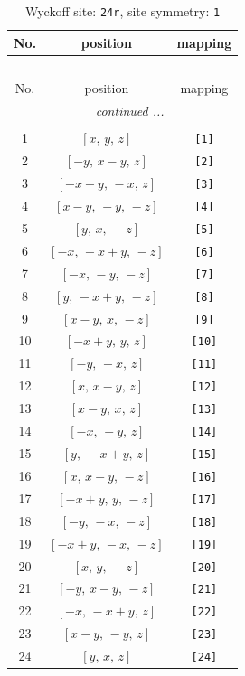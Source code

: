 \documentclass[fleqn,8pt]{jsarticle}
\begin{document}
\begin{longtable}{ccc}
\caption{Wyckoff site: {\tt 24r}, site symmetry: {\tt 1}}
 \\
 \hline \hline
No. & position & mapping \\ \hline \endfirsthead

\multicolumn{2}{l}{\tablename\ \thetable{}} \\
 \hline \hline
No. & position & mapping \\ \hline \endhead

 \hline \hline
\multicolumn{2}{r}{\footnotesize\it continued ...} \\ \endfoot

 \hline \hline
\multicolumn{2}{r}{} \\ \endlastfoot

1 & $\left[ x,\, y,\, z \right]$ & {\tt [1]} \\ \hline
2 & $\left[ - y,\, x - y,\, z \right]$ & {\tt [2]} \\ \hline
3 & $\left[ - x + y,\, - x,\, z \right]$ & {\tt [3]} \\ \hline
4 & $\left[ x - y,\, - y,\, - z \right]$ & {\tt [4]} \\ \hline
5 & $\left[ y,\, x,\, - z \right]$ & {\tt [5]} \\ \hline
6 & $\left[ - x,\, - x + y,\, - z \right]$ & {\tt [6]} \\ \hline
7 & $\left[ - x,\, - y,\, - z \right]$ & {\tt [7]} \\ \hline
8 & $\left[ y,\, - x + y,\, - z \right]$ & {\tt [8]} \\ \hline
9 & $\left[ x - y,\, x,\, - z \right]$ & {\tt [9]} \\ \hline
10 & $\left[ - x + y,\, y,\, z \right]$ & {\tt [10]} \\ \hline
11 & $\left[ - y,\, - x,\, z \right]$ & {\tt [11]} \\ \hline
12 & $\left[ x,\, x - y,\, z \right]$ & {\tt [12]} \\ \hline
13 & $\left[ x - y,\, x,\, z \right]$ & {\tt [13]} \\ \hline
14 & $\left[ - x,\, - y,\, z \right]$ & {\tt [14]} \\ \hline
15 & $\left[ y,\, - x + y,\, z \right]$ & {\tt [15]} \\ \hline
16 & $\left[ x,\, x - y,\, - z \right]$ & {\tt [16]} \\ \hline
17 & $\left[ - x + y,\, y,\, - z \right]$ & {\tt [17]} \\ \hline
18 & $\left[ - y,\, - x,\, - z \right]$ & {\tt [18]} \\ \hline
19 & $\left[ - x + y,\, - x,\, - z \right]$ & {\tt [19]} \\ \hline
20 & $\left[ x,\, y,\, - z \right]$ & {\tt [20]} \\ \hline
21 & $\left[ - y,\, x - y,\, - z \right]$ & {\tt [21]} \\ \hline
22 & $\left[ - x,\, - x + y,\, z \right]$ & {\tt [22]} \\ \hline
23 & $\left[ x - y,\, - y,\, z \right]$ & {\tt [23]} \\ \hline
24 & $\left[ y,\, x,\, z \right]$ & {\tt [24]} \\
\end{longtable}
\end{document}

